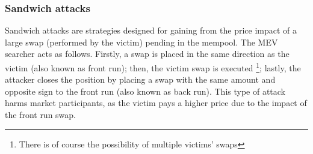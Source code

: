 \documentclass[a4paper,11pt]{article}
\begin{document}



\subsubsection{Sandwich attacks}
Sandwich attacks are strategies designed for gaining from the price impact of a large swap (performed by the victim) pending in the mempool. The MEV searcher acts as follows. Firstly, a swap is placed in the same direction as the victim (also known as front run); then, the victim swap is executed \footnote{There is of course the possibility of multiple victims' swaps}; lastly, the attacker closes the position by placing a swap with the same amount and opposite sign to the front run (also known as back run). This type of attack harms market participants, as the victim pays a higher price due to the impact of the front run swap.
\end{document}
